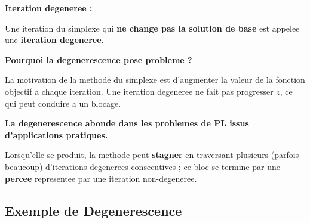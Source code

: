 \documentclass[12pt,a4paper]{article}
\begin{document}
\begin{definition}
\textbf{Iteration degeneree :}

Une iteration du simplexe qui \textcolor{importantrouge}{\textbf{ne change pas la solution de base}} est appelee une \textcolor{defvert}{\textbf{iteration degeneree}}.
\end{definition}

\begin{important}
\textbf{Pourquoi la degenerescence pose probleme ?}

La motivation de la methode du simplexe est d'augmenter la valeur de la fonction objectif a chaque iteration. Une iteration degeneree ne fait pas progresser $z$, ce qui peut conduire a un blocage.

\textcolor{importantrouge}{\textbf{La degenerescence abonde dans les problemes de PL issus d'applications pratiques.}}

Lorsqu'elle se produit, la methode peut \textcolor{titrebleu}{\textbf{stagner}} en traversant plusieurs (parfois beaucoup) d'iterations degenerees consecutives ; ce bloc se termine par une \textcolor{defvert}{\textbf{percee}} representee par une iteration non-degeneree.
\end{important}
\newpage
\subsection{Exemple de Degenerescence}
\end{document}

